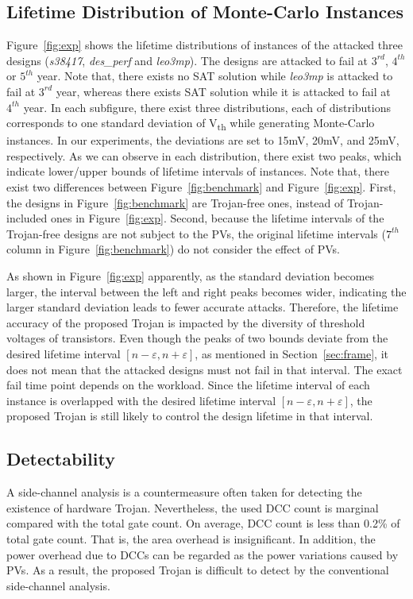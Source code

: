 \subsection{Lifetime Distribution of Monte-Carlo Instances}
\label{sec:exp:exp}
Figure~\ref{fig:exp} shows the lifetime distributions of instances of the attacked three designs (\textit{s38417}, \textit{des\_perf} and \textit{leo3mp}). The designs are attacked to fail at $3^{rd}$, $4^{th}$ or $5^{th}$ year. Note that, there exists no SAT solution while \textit{leo3mp} is attacked to fail at $3^{rd}$ year, whereas there exists SAT solution while it is attacked to fail at $4^{th}$ year. In each subfigure, there exist three distributions, each of distributions corresponds to one standard deviation of V\textsubscript{th} while generating Monte-Carlo instances. In our experiments, the deviations are set to 15mV, 20mV, and 25mV, respectively. As we can observe in each distribution, there exist two peaks, which indicate lower/upper bounds of lifetime intervals of instances. Note that, there exist two differences between Figure~\ref{fig:benchmark} and Figure~\ref{fig:exp}. First, the designs in Figure~\ref{fig:benchmark} are Trojan-free ones, instead of Trojan-included ones in Figure~\ref{fig:exp}. Second, because the lifetime intervals of the Trojan-free designs are not subject to the PVs, the original lifetime intervals ($7^{th}$ column in Figure~\ref{fig:benchmark}) do not consider the effect of PVs.

As shown in Figure~\ref{fig:exp} apparently, as the standard deviation becomes larger, the interval between the left and right peaks becomes wider, indicating the larger standard deviation leads to fewer accurate attacks. Therefore, the lifetime accuracy of the proposed Trojan is impacted by the diversity of threshold voltages of transistors. Even though the peaks of two bounds deviate from the desired lifetime interval $[n - \varepsilon, n + \varepsilon]$, as mentioned in Section~\ref{sec:frame}, it does not mean that the attacked designs must not fail in that interval. The exact fail time point depends on the workload. Since the lifetime interval of each instance is overlapped with the desired lifetime interval $[n - \varepsilon, n + \varepsilon]$, the proposed Trojan is still likely to control the design lifetime in that interval.

\subsection{Detectability}
\label{sec:exp:det}
A side-channel analysis is a countermeasure often taken for detecting the existence of hardware Trojan. Nevertheless, the used DCC count is marginal compared with the total gate count. On average, DCC count is less than 0.2\% of total gate count. That is, the area overhead is insignificant. In addition, the power overhead due to DCCs can be regarded as the power variations caused by PVs. As a result, the proposed Trojan is difficult to detect by the conventional side-channel analysis. 

